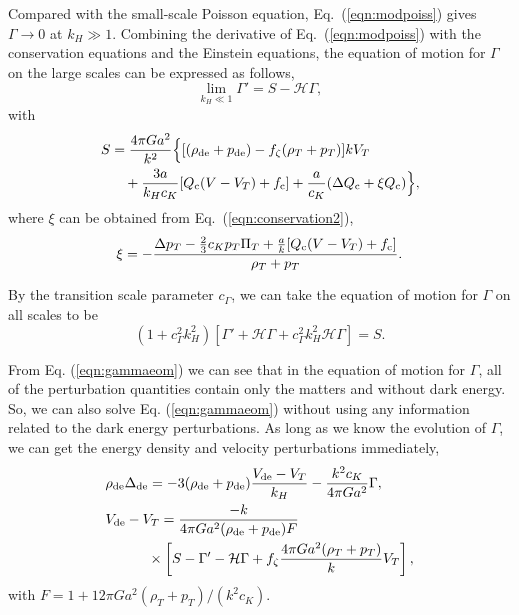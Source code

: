 \documentclass[aps,prd,nofootinbib,amsmath,amssymb,superscriptaddress,twocolumn,10pt]{revtex4}%
\newcommand{\ck}{c_K}
\newcommand{\tppi}{\ck p_T \Pi_T}
\begin{document}
Compared with the small-scale Poisson equation, Eq.~(\ref{eqn:modpoiss}) gives $\Gamma\rightarrow0$ at $k_H\gg1$. Combining the derivative of Eq.~(\ref{eqn:modpoiss}) with the conservation equations and the Einstein equations, the equation of motion for $\Gamma$ on the large scales can be expressed as follows,
\begin{equation}\label{eq:gammadot}
\lim_{k_H \ll 1} \Gamma'  = S -\mathcal{H}\Gamma,
\end{equation}
with
\begin{align}
S&={4\pi Ga^2
\over k^2 } \Big\{[(\rho_{\rm de}+p_{\rm de})-f_{\zeta}(\rho_T+p_T)]kV_T \nonumber\\
&\quad+{3a\over k_Hc_K}[Q_{\rm c}(V-V_T)+f_{\rm c}]+\frac{a}{c_K}(\Delta Q_{\rm c}+\xi Q_{\rm c})\Big\},\nonumber
\end{align}
where $\xi$ can be obtained from Eq.~(\ref{eqn:conservation2}),
\begin{equation}
\xi =  -{\Delta p_T - {2\over 3}\tppi+{a\over k}[Q_{\rm c}(V-V_T)+f_{\rm c}] \over \rho_T + p_T}.
\label{eqn:xieom}
\end{equation}

By the transition scale parameter $c_\Gamma$, we can take the equation of motion for $\Gamma$ on all scales to be \cite{Hu:2008zd,Fang:2008sn}
\begin{equation}
(1 + c_\Gamma^2 k_H^2) [\Gamma' +\mathcal{H} \Gamma + c_\Gamma^2 k_H^2 \mathcal{H}\Gamma] = S.
\label{eqn:gammaeom}
\end{equation}

From Eq. (\ref{eqn:gammaeom}) we can see that in the equation of motion for $\Gamma$, all of the perturbation quantities contain only the matters and without dark energy. So, we can also solve Eq. (\ref{eqn:gammaeom}) without using any information related to the dark energy perturbations. As long as we know the evolution of $\Gamma$, we can get the energy density and velocity perturbations immediately,
\begin{align}
&\rho_{\rm de}\Delta_{\rm de} =- 3(\rho_{\rm de}+p_{\rm de}) {V_{\rm de}-V_{T}\over k_{H} }-{k^{2}\ck \over 4\pi G a^{2}} \Gamma,\\ \label{eqn:ppffluid}
& V_{\rm de}-V_{T} ={-k \over 4\pi Ga^2 (\rho_{\rm de} + p_{\rm de}) F} \nonumber \\
&\quad\quad\quad\times\left[ S - \Gamma' - \mathcal{H}\Gamma + f_{\zeta}{4\pi Ga^2 (\rho_{T}+p_{T}) \over k}V_{T}
\right],
\end{align}
with $F = 1 +  12 \pi G a^2 (\rho_T + p_T)/( k^2 \ck)$.
\end{document}
